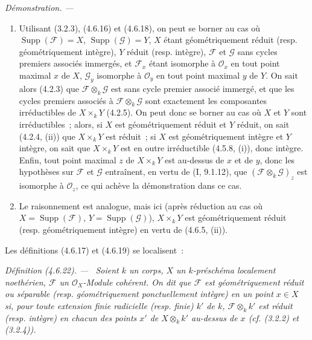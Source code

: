 \documentclass[10pt,oneside]{book}
\newenvironment{definition}[1][]{%
  \par\medskip\noindent\itshape Définition (#1). ---\ }{\par}
\newenvironment{proof}{%
  \par\medskip\noindent\textit{Démonstration. ---\ }}{\par}
\begin{document}
\begin{proof}
\begin{enumerate}
\item[(i)] Utilisant (3.2.3), (4.6.16) et (4.6.18), on peut se borner au cas où
$\operatorname{Supp}(\mathscr F)=X$, $\operatorname{Supp}(\mathscr G)=Y$, $X$
étant géométriquement réduit (resp. géométriquement intègre), $Y$ réduit
(resp. intègre), $\mathscr F$ et $\mathscr G$ sans cycles premiers associés
immergés, et $\mathscr F_x$ étant isomorphe à $\mathcal O_x$ en tout point
maximal $x$ de $X$, $\mathscr G_y$ isomorphe à $\mathcal O_y$ en tout point
maximal $y$ de $Y$. On sait alors (4.2.3) que
$\mathscr F\otimes_k\mathscr G$ est sans cycle premier associé immergé, et que
les cycles premiers associés à $\mathscr F\otimes_k\mathscr G$ sont exactement
les composantes irréductibles de $X\times_k Y$ (4.2.5). On peut donc se borner
au cas où $X$ et $Y$ sont irréductibles~; alors, si $X$ est géométriquement
réduit et $Y$ réduit, on sait (4.2.4, (ii)) que $X\times_k Y$ est réduit~; si
$X$ est géométriquement intègre et $Y$ intègre, on sait que $X\times_k Y$ est
en outre irréductible (4.5.8, (i)), donc intègre. Enfin, tout point maximal $z$
de $X\times_k Y$ est au-dessus de $x$ et de $y$, donc les hypothèses sur
$\mathscr F$ et $\mathscr G$ entraînent, en vertu de (I, 9.1.12), que
$(\mathscr F\otimes_k\mathscr G)_z$ est isomorphe à $\mathcal O_z$, ce qui
achève la démonstration dans ce cas.

\item[(ii)] Le raisonnement est analogue, mais ici (après réduction au cas où
$X=\operatorname{Supp}(\mathscr F)$, $Y=\operatorname{Supp}(\mathscr G)$),
$X\times_k Y$ est géométriquement réduit (resp. géométriquement intègre) en
vertu de (4.6.5, (ii)).
\end{enumerate}
\end{proof}

Les définitions (4.6.17) et (4.6.19) se localisent~:

\begin{definition}[4.6.22]
\label{IV.2.4.6.22-fr}
Soient $k$ un corps, $X$ un $k$-préschéma localement noethérien, $\mathscr F$
un $\mathcal O_X$-Module cohérent. On dit que $\mathscr F$ est
\emph{géométriquement réduit} ou \emph{séparable} (resp. géométriquement
ponctuellement intègre) en un point $x\in X$ si, pour toute extension finie
radicielle (resp. finie) $k'$ de $k$, $\mathscr F\otimes_k k'$ est réduit
(resp. intègre) en chacun des points $x'$ de $X\otimes_k k'$ au-dessus de $x$
(cf. (3.2.2) et (3.2.4)).
\end{definition}
\end{document}
